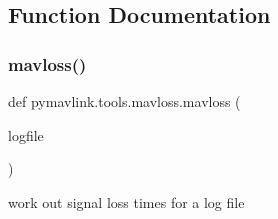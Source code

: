 \subsection{Function Documentation}
\mbox{\label{namespacepymavlink_1_1tools_1_1mavloss_ad6189b16a6cc39452070425c82c2835b}} 
\subsubsection{\texorpdfstring{mavloss()}{mavloss()}}
{\footnotesize\ttfamily def pymavlink.\+tools.\+mavloss.\+mavloss (\begin{DoxyParamCaption}\item[{}]{logfile }\end{DoxyParamCaption})}

\begin{DoxyVerb}work out signal loss times for a log file\end{DoxyVerb}
 